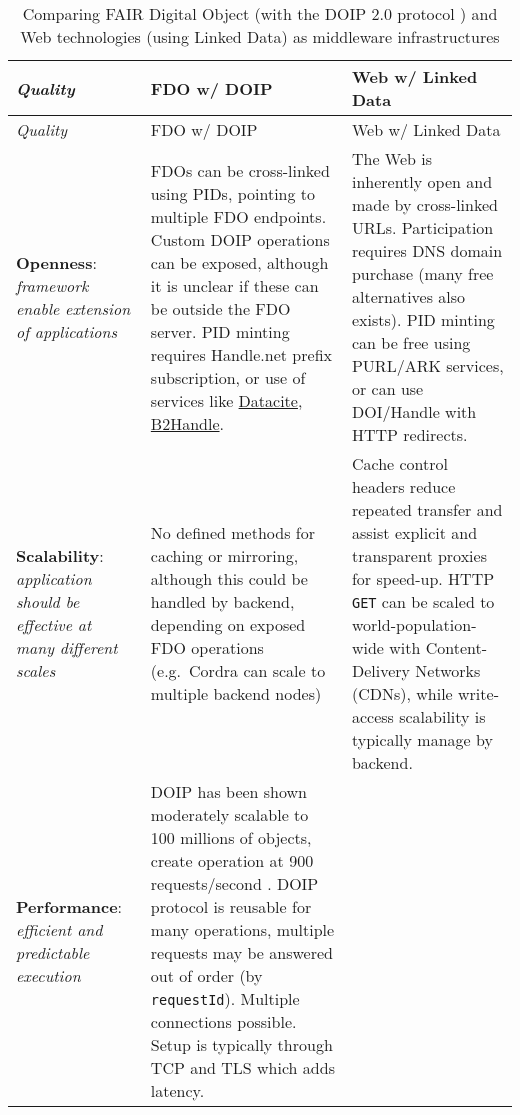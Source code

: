 \begin{landscape}
  \begin{small}
  \begin{longtable}[]{@{}
    >{\raggedright\arraybackslash}p{}
    >{\raggedright\arraybackslash}p{}
    >{\raggedright\arraybackslash}p{}@{}}
    \caption[Comparing FAIR Digital Object and Web technologies as middleware infrastructures]{Comparing FAIR Digital Object (with the DOIP 2.0 protocol \cite{DONA 2018}) and Web technologies (using Linked Data) as middleware infrastructures \cite{zarrasComparisonFrameworkMiddleware2004a}
  \label{ch3:fdo-web-middleware}}\tabularnewline
  \toprule
  \emph{Quality} & 
  FDO w/ DOIP & 
  Web w/ Linked Data \\
  \midrule
  \endfirsthead
  \toprule
  \emph{Quality} & 
  FDO w/ DOIP & 
  Web w/ Linked Data \\
  \midrule
  \endhead
  \textbf{Openness}: \emph{framework enable extension of applications}
    & FDOs can be cross-linked using PIDs, pointing to multiple FDO endpoints. Custom DOIP operations can be exposed, although it is unclear if these can be outside the FDO server. PID minting requires Handle.net prefix subscription, or use of services like \href{https://datacite.org/}{Datacite}, \href{https://eudat.eu/services/userdoc/b2handle}{B2Handle}.
    & The Web is inherently open and made by cross-linked URLs. Participation requires DNS domain purchase (many free alternatives also exists). PID minting can be free using PURL/ARK services, or can use DOI/Handle with HTTP redirects. \\
  \textbf{Scalability}: \emph{application should be effective at many different scales}
    & No defined methods for caching or mirroring, although this could be handled by backend, depending on exposed FDO operations (e.g.~Cordra can scale to multiple backend nodes)
    & Cache control headers reduce repeated transfer and assist explicit and transparent proxies for speed-up. HTTP \texttt{GET} can be scaled to world-population-wide with Content-Delivery Networks (CDNs), while write-access scalability is typically manage by backend. \\
  \textbf{Performance}: \emph{efficient and predictable execution}
    & DOIP has been shown moderately scalable to 100 millions of objects, create operation at 900 requests/second . DOIP protocol is reusable for many operations, multiple requests may be answered out of order (by \texttt{requestId}). Multiple connections possible. Setup is typically through TCP and TLS which adds latency.

\end{longtable}
\end{small}
\end{landscape}

